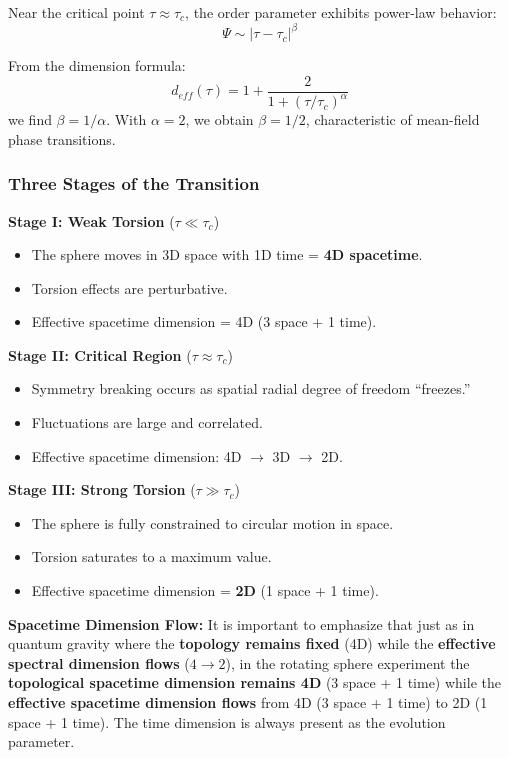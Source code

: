 \documentclass[UTF8]{ctex}\n\documentclass[12pt,a4paper]{article}
\begin{document}
Near the critical point $\tau \approx \tau_c$, the order parameter exhibits power-law behavior:
\begin{equation}
    \Psi \sim |\tau - \tau_c|^\beta
\end{equation}

From the dimension formula:
\begin{equation}
    d_{eff}(\tau) = 1 + \frac{2}{1+(\tau/\tau_c)^\alpha}
\end{equation}
we find $\beta = 1/\alpha$. With $\alpha = 2$, we obtain $\beta = 1/2$, characteristic of mean-field phase transitions.

\subsubsection{Three Stages of the Transition}

\textbf{Stage I: Weak Torsion} ($\tau \ll \tau_c$)
\begin{itemize}
    \item The sphere moves in 3D space with 1D time = \textbf{4D spacetime}.
    \item Torsion effects are perturbative.
    \item Effective spacetime dimension = 4D (3 space + 1 time).
\end{itemize}

\textbf{Stage II: Critical Region} ($\tau \approx \tau_c$)
\begin{itemize}
    \item Symmetry breaking occurs as spatial radial degree of freedom ``freezes.''
    \item Fluctuations are large and correlated.
    \item Effective spacetime dimension: 4D $\to$ 3D $\to$ 2D.
\end{itemize}

\textbf{Stage III: Strong Torsion} ($\tau \gg \tau_c$)
\begin{itemize}
    \item The sphere is fully constrained to circular motion in space.
    \item Torsion saturates to a maximum value.
    \item Effective spacetime dimension = \textbf{2D} (1 space + 1 time).
\end{itemize}

\textbf{Spacetime Dimension Flow:} It is important to emphasize that just as in quantum gravity where the \textbf{topology remains fixed} (4D) while the \textbf{effective spectral dimension flows} ($4 \to 2$), in the rotating sphere experiment the \textbf{topological spacetime dimension remains 4D} (3 space + 1 time) while the \textbf{effective spacetime dimension flows} from 4D (3 space + 1 time) to 2D (1 space + 1 time). The time dimension is always present as the evolution parameter.
\end{document}
